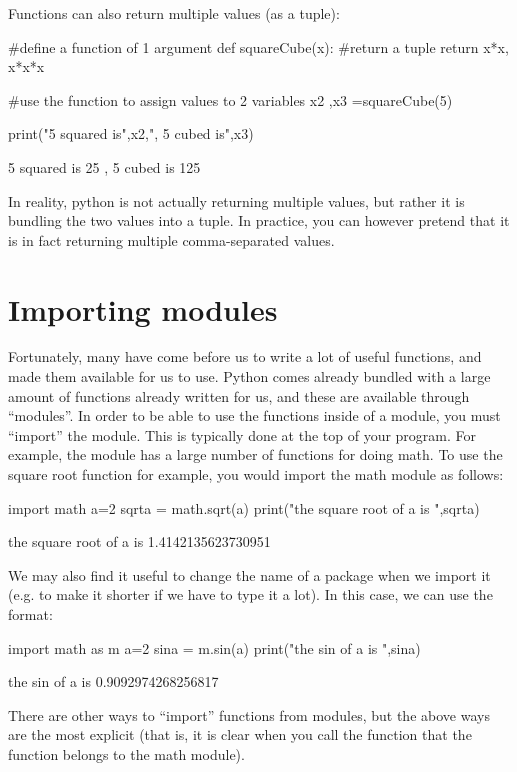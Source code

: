 Functions can also return multiple values (as a tuple):
\begin{python}[caption = \mbox{}]
#define a function of 1 argument
def squareCube(x):
  #return a tuple
  return x*x, x*x*x

#use the function to assign values to 2 variables
x2 ,x3 =squareCube(5)

print("5 squared is",x2,", 5 cubed is",x3)
\end{python}
\begin{poutput}
5 squared is 25 , 5 cubed is 125
\end{poutput}
In reality, python is not actually returning multiple values, but rather it is bundling the two values into a tuple. In practice, you can however pretend that it is in fact returning multiple comma-separated values.

\section{Importing modules}
Fortunately, many have come before us to write a lot of useful functions, and made them available for us to use. Python comes already bundled with a large amount of functions already written for us, and these are available through ``modules''. In order to be able to use the functions inside of a module, you must ``import'' the module. This is typically done at the top of your program. For example, the  module has a large number of functions for doing math. To use the square root function for example, you would import the math module as follows:
\begin{python}[caption = \mbox{}]
import math
a=2
sqrta = math.sqrt(a)
print("the square root of a is ",sqrta)
\end{python}
\begin{poutput}
the square root of a is  1.4142135623730951
\end{poutput}
We may also find it useful to change the name of a package when we import it (e.g. to make it shorter if we have to type it a lot). In this case, we can use the  format:
\begin{python}[caption = \mbox{}]
import math as m
a=2
sina = m.sin(a)
print("the sin of a is ",sina)
\end{python}
\begin{poutput}
the sin of a is  0.9092974268256817
\end{poutput}
There are other ways to ``import'' functions from modules, but the above ways are the most explicit (that is, it is clear when you call the function  that the function belongs to the math module).

